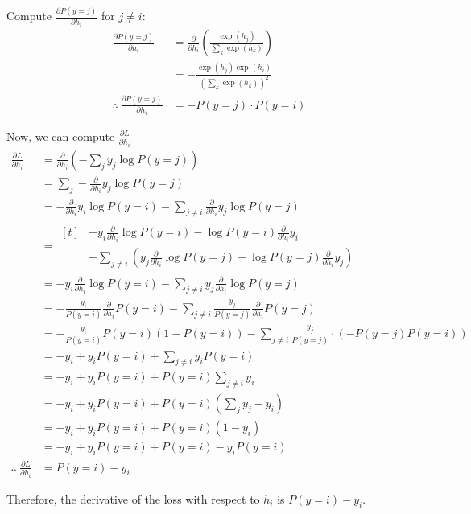 \documentclass[12pt]{article}
\begin{document}
Compute $\frac{\partial P(y=j)}{\partial h_i}$ for $j\neq i$:
\begin{align*}
\frac{\partial P(y=j)}{\partial h_i} &= \frac{\partial}{\partial h_i} \left( \frac{\exp(h_j)}{\sum_k \exp(h_k)} \right) \\
&= -\frac{\exp(h_j) \exp(h_i)}{(\sum_k \exp(h_k))^2} \\
\therefore\ \frac{\partial P(y=j)}{\partial h_i} &= -P(y=j) \cdot P(y=i)
\end{align*}

Now, we can compute $\frac{\partial L}{\partial h_i}$
\begin{align*}
    \frac{\partial L}{\partial h_i}
    &= \frac{\partial}{\partial h_i} \left( -\sum_j y_j \log P(y = j) \right) \\
    &= \sum_j - \frac{\partial}{\partial h_i} y_j \log P(y = j) \\
    &= - \frac{\partial}{\partial h_i} y_i \log P(y = i) - \sum_{j\neq i} \frac{\partial}{\partial h_i} y_j \log P(y = j) \\
    &= \begin{aligned}[t]
        & - y_i \frac{\partial}{\partial h_i} \log P(y = i) - \log P(y = i) \frac{\partial}{\partial h_i} y_i \\
        & - \sum_{j\neq i} \left( y_j \frac{\partial}{\partial h_i} \log P(y = j) + \log P(y = j) \frac{\partial}{\partial h_i} y_j \right)
    \end{aligned} \\
    &= - y_i \frac{\partial}{\partial h_i} \log P(y = i) 
        - \sum_{j\neq i} y_j \frac{\partial}{\partial h_i} \log P(y = j) \\
    &= - \frac{y_i}{P(y=i)} \frac{\partial}{\partial h_i} P(y = i) 
        - \sum_{j\neq i} \frac{y_j}{P(y=j)} \frac{\partial}{\partial h_i} P(y=j) \\
    &=  - \frac{y_i}{P(y=i)} P(y=i) (1-P(y=i))
        - \sum_{j\neq i} \frac{y_j}{P(y=j)} \cdot (-P(y=j)P(y=i)) \\
    &= - y_i + y_i P(y=i) + \sum_{j\neq i} y_i P(y=i) \\
    &= - y_i + y_i P(y=i) + P(y=i) \sum_{j\neq i} y_i \\
    &= - y_i + y_i P(y=i) + P(y=i) \left( \sum_{j} y_j - y_i \right) \\
    &= - y_i + y_i P(y=i) + P(y=i) \left( 1 - y_i \right) \\
    &= - y_i + y_i P(y=i) + P(y=i) - y_i P(y=i) \\
    \therefore\ \frac{\partial L}{\partial h_i} &= P(y=i) - y_i
\end{align*}

Therefore, the derivative of the loss with respect to $h_i$ is $P(y=i) - y_i$.
\end{document}
